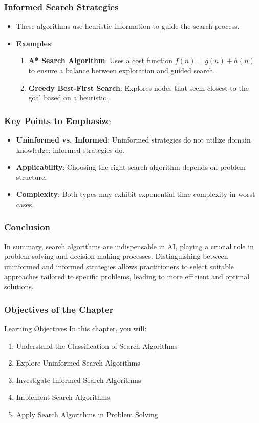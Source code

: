 \documentclass[aspectratio=169]{beamer}
\begin{document}
\begin{frame}[fragile]
    \frametitle{Informed Search Strategies}
    \begin{itemize}
        \item These algorithms use heuristic information to guide the search process.
        \item \textbf{Examples}:
        \begin{enumerate}
            \item \textbf{A* Search Algorithm}: Uses a cost function $f(n) = g(n) + h(n)$ to ensure a balance between exploration and guided search.
            \item \textbf{Greedy Best-First Search}: Explores nodes that seem closest to the goal based on a heuristic.
        \end{enumerate}
    \end{itemize}
\end{frame}

\begin{frame}[fragile]
    \frametitle{Key Points to Emphasize}
    \begin{itemize}
        \item \textbf{Uninformed vs. Informed}: Uninformed strategies do not utilize domain knowledge; informed strategies do.
        \item \textbf{Applicability}: Choosing the right search algorithm depends on problem structure.
        \item \textbf{Complexity}: Both types may exhibit exponential time complexity in worst cases.
    \end{itemize}
\end{frame}

\begin{frame}[fragile]
    \frametitle{Conclusion}
    In summary, search algorithms are indispensable in AI, playing a crucial role in problem-solving and decision-making processes. Distinguishing between uninformed and informed strategies allows practitioners to select suitable approaches tailored to specific problems, leading to more efficient and optimal solutions.
\end{frame}

\begin{frame}[fragile]
    \frametitle{Objectives of the Chapter}
    \begin{block}{Learning Objectives}
        In this chapter, you will:
        \begin{enumerate}
            \item Understand the Classification of Search Algorithms
            \item Explore Uninformed Search Algorithms
            \item Investigate Informed Search Algorithms
            \item Implement Search Algorithms
            \item Apply Search Algorithms in Problem Solving
        \end{enumerate}
    \end{block}
\end{frame}
\end{document}
